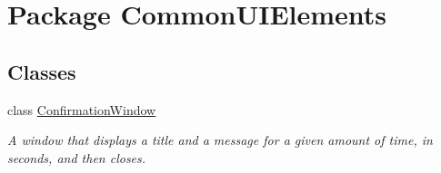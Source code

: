 \hypertarget{namespaceCommonUIElements}{}\section{Package Common\+U\+I\+Elements}
\label{namespaceCommonUIElements}
\subsection*{Classes}
\begin{DoxyCompactItemize}
\item 
class \hyperlink{classCommonUIElements_1_1ConfirmationWindow}{Confirmation\+Window}
\begin{DoxyCompactList}\small\item\em A window that displays a title and a message for a given amount of time, in seconds, and then closes. \end{DoxyCompactList}\end{DoxyCompactItemize}
